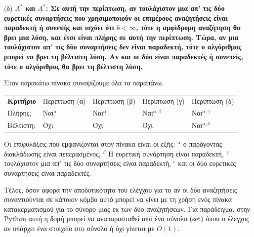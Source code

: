 \documentclass[12pt]{article}
\newcommand {\lat}{\latintext}
\theoremstyle{definition}
\begin{document}
\noindent (δ) \bf $Α^*$ και $A^*$: \normalfont Σε αυτή την περίπτωση, αν τουλάχιστον μια απ' τις δύο ευρετικές συναρτήσεις που χρησιμοποιούν οι επιμέρους αναζητήσεις είναι παραδεκτή ή συνεπής και ισχύει ότι $b<\infty$, τότε η αμφίδρομη αναζήτηση θα βρει μια λύση, και έτσι είναι πλήρης σε αυτή την περίπτωση. Τώρα, αν μια τουλάχιστον απ' τις δύο συναρτήσεις δεν είναι παραδεκτή, τότε ο αλγόριθμος μπορεί να βρει τη βέλτιστη λύση. Αν και οι δύο είναι παραδεκτές ή συνεπείς, τότε ο αλγόριθμος θα βρει τη βέλτιστη λύση.
\vspace{2mm}

\noindent Στον παρακάτω πίνακα συνοψίζουμε όλα τα παραπάνω.

\begin{center}
 \label{tab:2} 
\begin{tabular}{ C{1in} C{1in} C{1in} C{1in} C{1in}}\toprule[1.5pt]
\bf Κριτήριο & Περίπτωση (α) & Περίπτωση (β) & Περίπτωση (γ) & Περίπτωση (δ)\\
Πλήρης{\lat ;} & Ναι$^\alpha$ & Ναι$^\alpha$ & Ναι$^{\alpha,\beta}$ & Ναι$^{\alpha,\gamma}$\\
Βέλτιστη{\lat ;} & Όχι & Όχι & Όχι & Ναι$^{\alpha,\delta}$ \\
\bottomrule[1.5pt]
\end{tabular}
\end{center}
\noindent Οι επιφυλάξεις που εμφανίζονται στον πίνακα είναι οι εξής: $^\alpha$ ο παράγοντας διακλάδωσης είναι πεπερασμένος, $^\beta$ Η ευρετική συνάρτηση είναι παραδεκτή, $^\gamma$ τουλάχιστον μια απ' τις δύο συναρτήσεις είναι παραδεκτή, $^\epsilon$ και οι δύο ευρετικές συναρτήσεις είναι παραδεκτές.
\vspace{2mm}

\noindent Τέλος, όσον αφορά την αποδοτικότητα του ελέγχου για το αν οι δύο αναζητήσεις συναντιούνται σε κάποιον κόμβο αυτό μπορεί να γίνει με τη χρήση ενός πίνακα κατακερματισμού για το σύνορο μιας εκ των δύο αναζητήσεων. Για παράδειγμα, στην {\lat Python} αυτή η δομή μπορεί να αναπαρασταθεί από ένα σύνολο ({\lat set}) όπου ο έλεγχος αν υπάρχει ένα στοιχείο στο σύνολο ή όχι γίνεται με $O(1)$.
\end{document}

